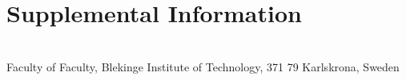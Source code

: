 \documentclass[a4paper,twoside]{bth}
\newcommand{\faculty}{Faculty}
\begin{document}
% 
% 
% 
% 
% 
% 





\appendix
\chapter{Supplemental Information}


\cleardoublepage
\thispagestyle{empty}
\vspace*{\fill}
\clearpage{\thispagestyle{empty}}
\changepage{3cm}{1cm}{-0.5cm}{-0.5cm}{}{-1.5cm}{}{}{}
\vspace*{\fill}
\center

{\bthcsnotextlogo{3cm}}
\\
\noindent\makebox[\linewidth]{\rule{\textwidth}{1pt}} 
Faculty of \faculty, Blekinge Institute of Technology, 371 79 Karlskrona, Sweden
\end{document}
